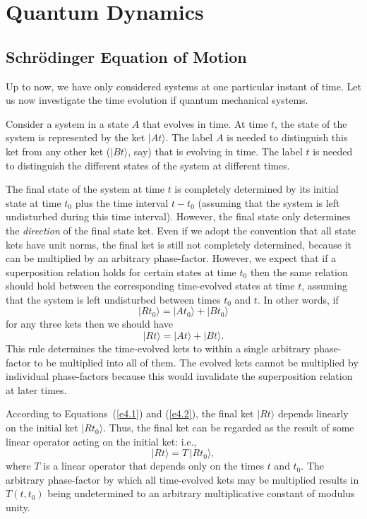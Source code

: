 \chapter{Quantum Dynamics}\label{s4}

\section{Schr\"{o}dinger Equation of Motion}\label{s4.1}
Up to now, we have only considered systems at one particular instant of time. 
Let us now investigate the time evolution if quantum mechanical systems. 

Consider a system in a state $A$ that evolves in time. At time
$t$, the state of the system is represented by the ket $|At\rangle$. The label
$A$ is needed to distinguish this ket from any other ket ($|Bt\rangle$, say)
that is evolving in time. The label $t$ is needed to distinguish the different
states of the system at different times. 

The final state of the system at time $t$ is completely determined by its
initial state at time $t_0$ plus the time interval $t-t_0$ (assuming that 
the system is left undisturbed during this time interval). However, the
final state only determines the {\em direction} of the final state ket. 
Even if we adopt the convention that all state kets have unit norms,
the final ket is still not completely determined, because it can be multiplied
by an arbitrary
 phase-factor. However, we expect that if a superposition relation 
holds for certain states at time $t_0$ then the same relation
should hold between the corresponding time-evolved states at time $t$, assuming
that the system is left undisturbed between times $t_0$ and $t$.
In other words,
if
\begin{equation}\label{e4.1}
|Rt_0\rangle = |At_0\rangle + |B t_0\rangle
\end{equation}
for any three kets then we should  have
\begin{equation}\label{e4.2}
|Rt\rangle = |At\rangle + |B t\rangle.
\end{equation}
This rule determines the time-evolved kets to within a single arbitrary phase-factor to be multiplied into all of them. The evolved kets cannot be multiplied
by individual phase-factors because this would invalidate the superposition
relation at later times.

According to Equations~(\ref{e4.1}) and (\ref{e4.2}), the final ket $|Rt\rangle$ depends linearly
on the initial ket $|Rt_0\rangle$. Thus, the final ket can be regarded as the
result of some linear operator acting on the initial ket: {\rm i.e.},
\begin{equation}\label{e4.3}
|Rt\rangle = T\, |Rt_0\rangle,
\end{equation}
where $T$ is a linear operator that depends only on the times $t$
and $t_0$. 
The arbitrary phase-factor by which all time-evolved kets may be multiplied
results in $T(t, t_0)$ being undetermined to an arbitrary multiplicative constant
of modulus unity. 

